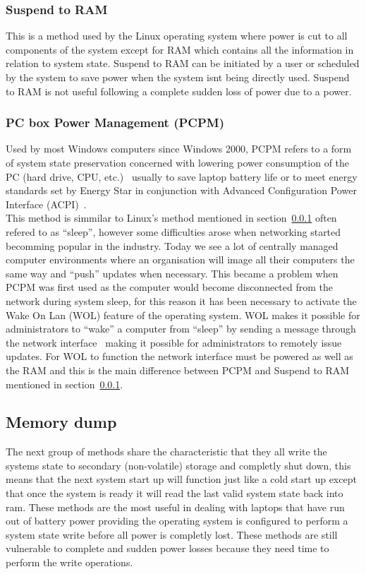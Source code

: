 \documentclass[a4,12pt]{article}
\begin{document}
\subsubsection{Suspend to RAM}\label{sec:stRam}
This is a method used by the Linux operating system where power is cut to all components of the system except for RAM which contains all the information in relation to system state.\citep{Wiki}
Suspend to RAM can be initiated by a user or scheduled by the system to save power when the system isnt being directly used. Suspend to RAM is not useful following a complete sudden loss of power due to a power.
\subsubsection{PC box Power Management (PCPM)}
Used by most Windows computers since Windows 2000, PCPM refers to a form of system state preservation concerned with lowering power consumption of the PC (hard drive, CPU, etc.)~\citep{PCPM} usually to save laptop battery life or to meet energy standards set by Energy Star in conjunction with Advanced Configuration Power Interface (ACPI)~\citep{PCPM}.
\\This method is simmilar to Linux's method mentioned in section~\ref{sec:stRam} often refered to as ``sleep'', however some difficulties arose when networking started becomming popular in the industry. Today we see a lot of centrally managed computer environments where an organisation will image all their computers the same way and ``push'' updates when necessary. This became a problem when PCPM was first used as the computer would become disconnected from the network during system sleep, for this reason it has been necessary to activate the Wake On Lan (WOL) feature of the operating system. WOL makes it possible for administrators to ``wake'' a computer from ``sleep'' by sending a message through the network interface~\citep{WOL} making it possible for administrators to remotely issue updates. For WOL to function the network interface must be powered as well as the RAM and this is the main difference between PCPM and Suspend to RAM mentioned in section~\ref{sec:stRam}.

\subsection{Memory dump}\label{sec:memorydump}
The next group of methods share the characteristic that they all write the systems state to secondary (non-volatile) storage and completly shut down, this means that the next system start up will function just like a cold start up except that once the system is ready it will read the last valid system state back into ram.
These methods are the most useful in dealing with laptops that have run out of battery power providing the operating system is configured to perform a system state write before all power is completly lost. These methods are still vulnerable to complete and sudden power losses because they need time to perform the write operations.
\end{document}
